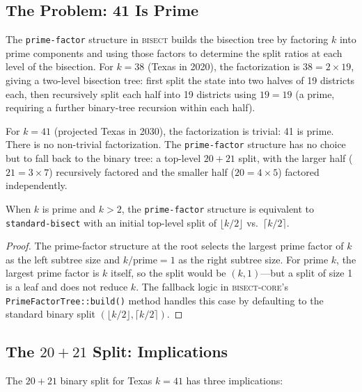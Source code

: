 \label{sec:texas}

\subsection{The Problem: 41 Is Prime}

The \texttt{prime-factor} structure in \textsc{bisect} builds the bisection tree
by factoring $k$ into prime components and using those factors to determine the split
ratios at each level of the bisection. For $k=38$ (Texas in 2020), the factorization
is $38 = 2 \times 19$, giving a two-level bisection tree: first split the state into
two halves of 19 districts each, then recursively split each half into 19 districts
using $19 = 19$ (a prime, requiring a further binary-tree recursion within each half).

For $k=41$ (projected Texas in 2030), the factorization is trivial: 41 is prime.
There is no non-trivial factorization. The \texttt{prime-factor} structure has no
choice but to fall back to the binary tree: a top-level $20+21$ split, with the
larger half ($21 = 3 \times 7$) recursively factored and the smaller half ($20 = 4 \times 5$)
factored independently.

\begin{proposition}
When $k$ is prime and $k > 2$, the \texttt{prime-factor} structure is equivalent
to \texttt{standard-bisect} with an initial top-level split of $\lfloor k/2 \rfloor$
vs.\ $\lceil k/2 \rceil$.
\end{proposition}

\begin{proof}
The prime-factor structure at the root selects the largest prime factor of $k$
as the left subtree size and $k / \text{prime} = 1$ as the right subtree size.
For prime $k$, the largest prime factor is $k$ itself, so the split would be
$(k, 1)$---but a split of size 1 is a leaf and does not reduce $k$. The fallback
logic in \textsc{bisect-core}'s \texttt{PrimeFactorTree::build()} method handles
this case by defaulting to the standard binary split $(\lfloor k/2 \rfloor, \lceil k/2 \rceil)$.
\end{proof}

\subsection{The $20+21$ Split: Implications}

The $20+21$ binary split for Texas $k=41$ has three implications:

